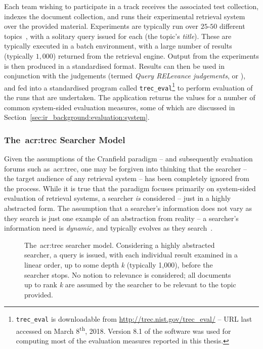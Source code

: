 Each team wishing to participate in a track receives the associated test collection, indexes the document collection, and runs their experimental retrieval system over the provided material. Experiments are typically run over $25$-$50$ different topics~\citep{voorhees2001iir_philosophy}, with a solitary query issued for each (the topic's \emph{title}). These are typically executed in a batch environment, with a large number of results (typically $1,000$) returned from the retrieval engine. Output from the experiments is then produced in a standardised format. Results can then be used in conjunction with the judgements (termed \emph{Query RELevance judgements}, or ), and fed into a standardised program called \texttt{trec\_eval}\footnote{\texttt{trec\_eval} is downloadable from \url{http://trec.nist.gov/trec_eval/} -- URL last accessed on March 8\textsuperscript{th}, 2018. Version 8.1 of the software was used for computing most of the evaluation measures reported in this thesis.} to perform evaluation of the runs that are undertaken. The application returns the values for a number of common system-sided evaluation measures, some of which are discussed in Section~\ref{sec:ir_background:evaluation:system}.

\subsubsection{The~\gls{acr:trec} Searcher Model}\label{sec:ir_background:paradigms:trec:model}
Given the assumptions of the Cranfield paradigm -- and subsequently evaluation forums such as~\gls{acr:trec}, one may be forgiven into thinking that the searcher -- the target audience of any retrieval system -- has been completely ignored from the process. While it is true that the paradigm focuses primarily on system-sided evaluation of retrieval systems, a searcher \emph{is} considered -- just in a highly abstracted form. The assumption that a searcher's information does not vary as they search is just one example of an abstraction from reality -- a searcher's information need is \emph{dynamic,} and typically evolves as they search~\citep{borlund2003iir_model}.

\begin{figure}[t!]
    \centering
    \caption[\gls{acr:trec} searcher model]{The~\gls{acr:trec} searcher model. Considering a highly abstracted searcher, a query is issued, with each individual result examined in a linear order, up to some depth \emph{k} (typically 1,000), before the searcher stops. No notion to relevance is considered; all documents up to rank \emph{k} are assumed by the searcher to be relevant to the topic provided.}
    \label{fig:trec_model}
\end{figure}

